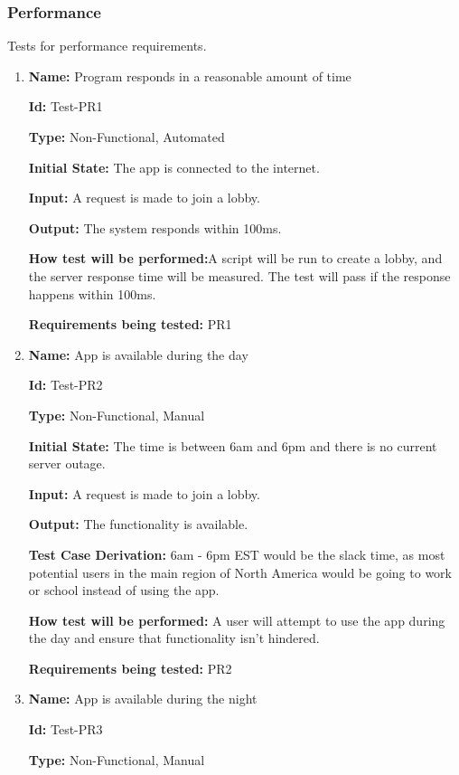 \documentclass[12pt, titlepage]{article}
\begin{document}
\subsubsection{Performance}
Tests for performance requirements.

\begin{enumerate}

\item{\textbf{Name:} Program responds in a reasonable amount of time}

\textbf{Id:} Test-PR1

\textbf{Type:} Non-Functional, Automated
					
\textbf{Initial State:} The app is connected to the internet. 
					
\textbf{Input:} A request is made to join a lobby.  
					
\textbf{Output:} The system responds within 100ms.
					
\textbf{How test will be performed:}A script will be run to create a lobby, and the server response time will be measured. The test will pass if the response happens within 100ms.

\textbf{Requirements being tested:} PR1

\item{\textbf{Name:} App is available during the day}

\textbf{Id:} Test-PR2

\textbf{Type:} Non-Functional, Manual
					
\textbf{Initial State:} The time is between 6am and 6pm and there is no current server outage. 
					
\textbf{Input:} A request is made to join a lobby.  
					
\textbf{Output:} The functionality is available. 

\textbf{Test Case Derivation:} 6am - 6pm EST would be the slack time, as most potential users in the main region of North America would be going to work or school instead of using the app.
					
\textbf{How test will be performed:} A user will attempt to use the app during the day and ensure that functionality isn't hindered. 

\textbf{Requirements being tested:} PR2

\item{\textbf{Name:} App is available during the night}

\textbf{Id:} Test-PR3

\textbf{Type:} Non-Functional, Manual
					

\end{enumerate}
\end{document}
